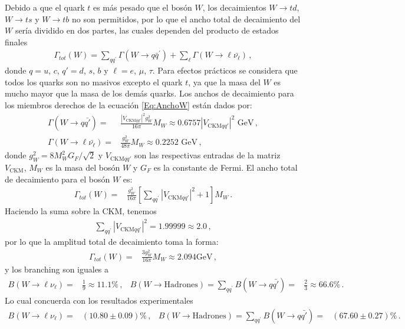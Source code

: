 Debido a que el quark $t$ es más pesado que el bosón $W$, los decaimientos $W \to t d$, $W \to t s$ y $W \to t b$ no son permitidos, por lo que el ancho total de decaimiento del $W$ sería dividido en dos partes, las cuales dependen del producto de estados finales
%
\begin{align}\label{Eq:AnchoW}
\Gamma_{tot} (W) = \sum_{q q^{\prime}}\Gamma(W \to q \bar{q}^{\prime}) + \sum_{\ell} \Gamma(W \to \ell \bar{\nu_{\ell}})\,,
\end{align}
%
donde $q = u$, $c$, $q' = d$, $s$, $b$ y $\ell = e$, $\mu$, $\tau$. Para efectos prácticos se considera que todos los quarks son no masivos excepto el quark $t$, ya que la masa del $W$ es mucho mayor que la masa de los demás quarks. Los anchos de decaimiento para los miembros derechos de la ecuación \eqref{Eq:AnchoW} están dados por:
%
\begin{align}\label{Eq:Gamma}
\Gamma(W \to q \bar{q'}) =& \frac{|V_{\text{CKM}qq'}|^2 g_W^2}{16 \pi} M_{W} \approx 0.6757 |V_{\text{CKM}qq'}|^2 \text{ GeV}\,, \\
\Gamma(W \to \ell \bar{\nu_{\ell}}) =& \frac{g_W^2}{48 \pi} M_{W}\approx 0.2252 \text{ GeV}\,,
\end{align}
%
donde $g_W^2 = 8M^2_{W}G_F / \sqrt{2}$ y $V_{\text{CKM}qq'}$ son las respectivas entradas de la matriz $V_{\text{CKM}}$, $M_{W}$ es la masa del bosón $W$ y $G_F$ es la constante de Fermi. El ancho total de decaimiento para el bosón $W$ es:
%
\begin{align}
\Gamma_{tot}(W) =& \frac{g_W^2}{16 \pi}\left[\sum_{q q^{\prime}} |V_{\text{CKM}qq'}|^2 + 1 \right] M_{W}\,.
\end{align}
%
Haciendo la suma sobre la CKM, tenemos \begin{align*}
\sum_{q q^{\prime}} |V_{\text{CKM}qq'}|^2 = 1.99999 \approx 2.0 \,,
\end{align*} por lo que la amplitud total de decaimiento toma la forma:
%
\begin{align}
\Gamma_{tot}(W) =& \frac{3 g_W^2}{16 \pi} M_{W} \approx 2.094 \text{GeV}\,,
\end{align}
%
y los branching son iguales a
%
\begin{align}\label{Eq:Branching}
B(W \to \ell \nu_{\ell}) =& \frac{1}{9} \approx 11.1\% \,, & 
B(W \to \text{Hadrones})= \sum_{q q^{\prime}} B(W \to q \bar{q'}) =& \frac{2}{3} \approx 66.6\%\,.
\end{align}
%
Lo cual concuerda con los resultados experimentales~\cite{Beringer:1900zz}
\begin{align*}
B(W \to \ell \nu_{\ell}) =& (10.80 \pm 0.09)\%\,, & B(W \to \text{Hadrones})= \sum_{q q^{\prime}} B(W \to q \bar{q'}) =& (67.60 \pm 0.27)\%\,.
\end{align*} 
